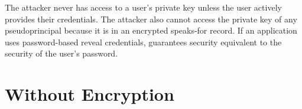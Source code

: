 %
%
The attacker never has access to a user's private key unless the user actively
provides their credentials.
%
The attacker also cannot access the private key of any pseudoprincipal because
it is in an encrypted speaks-for record.
%
%
If an application uses password-based reveal credentials, \sys
guarantees security equivalent to the security of the user's password.

\section{\sys Without Encryption}

